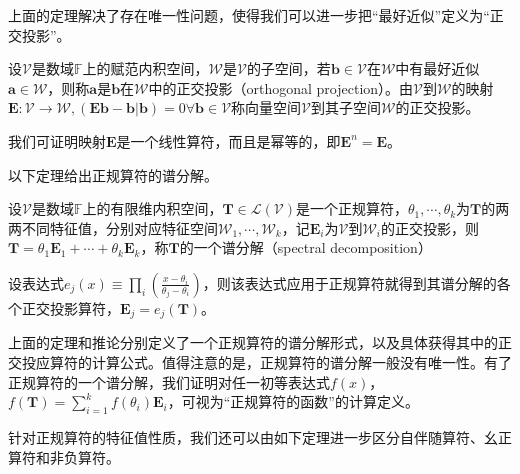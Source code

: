 \documentclass[main.tex]{subfiles}
\begin{document}
上面的定理解决了存在唯一性问题，使得我们可以进一步把“最好近似”定义为“正交投影”。

\begin{definition}[正交投影算符]
设$\mathcal{V}$是数域$\mathbb{F}$上的赋范内积空间，$\mathcal{W}$是$\mathcal{V}$的子空间，若$\mathbf{b}\in\mathcal{V}$在$\mathcal{W}$中有最好近似$\mathbf{a}\in\mathcal{W}$，则称$\mathbf{a}$是$\mathbf{b}$在$\mathcal{W}$中的正交投影（orthogonal projection）。由$\mathcal{V}$到$\mathcal{W}$的映射$\mathbf{E}:\mathcal{V}\rightarrow\mathcal{W},\left(\mathbf{Eb}-\mathbf{b}|\mathbf{b}\right)=0\forall\mathbf{b}\in\mathcal{V}$称向量空间$\mathcal{V}$到其子空间$\mathcal{W}$的正交投影。
\end{definition}

我们可证明映射$\mathbf{E}$是一个线性算符，而且是幂等的，即$\mathbf{E}^n=\mathbf{E}$。

以下定理给出正规算符的谱分解。

\begin{theorem}
设$\mathcal{V}$是数域$\mathbb{F}$上的有限维内积空间，$\mathbf{T}\in\mathcal{L}\left(\mathcal{V}\right)$是一个正规算符，$\theta_1,\cdots,\theta_k$为$\mathbf{T}$的两两不同特征值，分别对应特征空间$\mathcal{W}_1,\cdots,\mathcal{W}_k$，记$\mathbf{E}_i$为$\mathcal{V}$到$\mathcal{W}_i$的正交投影，则$\mathbf{T}=\theta_1\mathbf{E}_1+\cdots+\theta_k\mathbf{E}_k$，称$\mathbf{T}$的一个谱分解（spectral decomposition）
\end{theorem}

\begin{corollary}
设表达式$e_j\left(x\right)\equiv\prod_{i}\left(\frac{x-\theta_i}{\theta_j-\theta_i}\right)$，则该表达式应用于正规算符就得到其谱分解的各个正交投影算符，$\mathbf{E}_j=e_j\left(\mathbf{T}\right)$。
\end{corollary}

上面的定理和推论分别定义了一个正规算符的谱分解形式，以及具体获得其中的正交投应算符的计算公式。值得注意的是，正规算符的谱分解一般没有唯一性。有了正规算符的一个谱分解，我们证明对任一初等表达式$f\left(x\right)$，$f\left(\mathbf{T}\right)=\sum_{i=1}^kf\left(\theta_i\right)\mathbf{E}_i$，可视为“正规算符的函数”的计算定义。

针对正规算符的特征值性质，我们还可以由如下定理进一步区分自伴随算符、幺正算符和非负算符。
\end{document}
